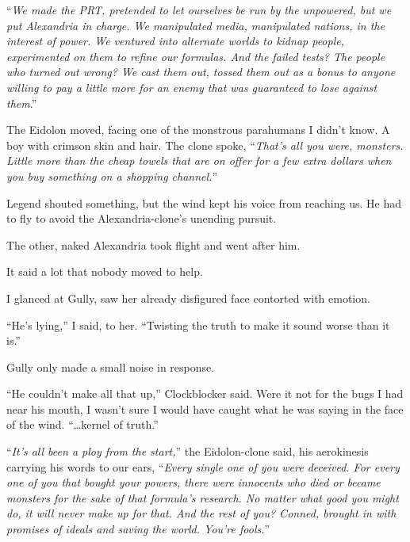 ``\emph{We made the PRT, pretended to let ourselves be run by the unpowered, but we put Alexandria in charge.  We manipulated media, manipulated nations, in the interest of power.  We ventured into alternate worlds to kidnap people, experimented on them to refine our formulas.  And the failed tests?  The people who turned out wrong?  We cast them out, tossed them out as a bonus to anyone willing to pay a little more for an enemy that was guaranteed to lose against them}.''



The Eidolon moved, facing one of the monstrous parahumans I didn't know.  A boy with crimson skin and hair.  The clone spoke, ``\emph{That's all you were, monsters.  Little more than the cheap towels that are on offer for a few extra dollars when you buy something on a shopping channel.}''



Legend shouted something, but the wind kept his voice from reaching us.  He had to fly to avoid the Alexandria-clone's unending pursuit.



The other, naked Alexandria took flight and went after him.



It said a lot that nobody moved to help.



I glanced at Gully, saw her already disfigured face contorted with emotion.



``He's lying,'' I said, to her.  ``Twisting the truth to make it sound worse than it is.''



Gully only made a small noise in response.



``He couldn't make all that up,'' Clockblocker said.  Were it not for the bugs I had near his mouth, I wasn't sure I would have caught what he was saying in the face of the wind.  ``\ldots kernel of truth.''



``\emph{It's all been a ploy from the start,}'' the Eidolon-clone said, his aerokinesis carrying his words to our ears, ``\emph{Every single one of you were deceived.  For every one of you that bought your powers, there were innocents who died or became monsters for the sake of that formula's research.  No matter what good you might do, it will never make up for that.  And the rest of you?  Conned, brought in with promises of ideals and saving the world.  You're fools.}''



